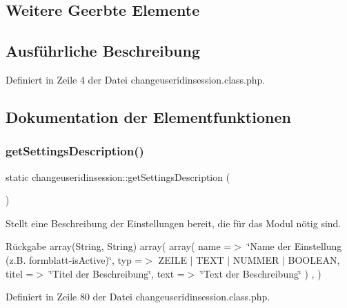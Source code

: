 \subsection*{Weitere Geerbte Elemente}


\subsection{Ausführliche Beschreibung}


Definiert in Zeile 4 der Datei changeuseridinsession.\+class.\+php.



\subsection{Dokumentation der Elementfunktionen}
\mbox{\label{classchangeuseridinsession_ab7adbdcd171a28a9ce89cd8e76aea03d}} 
\subsubsection{\texorpdfstring{get\+Settings\+Description()}{getSettingsDescription()}}
{\footnotesize\ttfamily static changeuseridinsession\+::get\+Settings\+Description (\begin{DoxyParamCaption}{ }\end{DoxyParamCaption})\hspace{0.3cm}{\ttfamily [static]}}

Stellt eine Beschreibung der Einstellungen bereit, die für das Modul nötig sind. \begin{DoxyReturn}{Rückgabe}
array(\+String, String) array( array( \textquotesingle{}name\textquotesingle{} =$>$ \char`\"{}\+Name der Einstellung (z.\+B. formblatt-\/is\+Active)\char`\"{}, \textquotesingle{}typ\textquotesingle{} =$>$ Z\+E\+I\+LE $\vert$ T\+E\+XT $\vert$ N\+U\+M\+M\+ER $\vert$ B\+O\+O\+L\+E\+AN, \textquotesingle{}titel\textquotesingle{} =$>$ \char`\"{}\+Titel der Beschreibung\char`\"{}, \textquotesingle{}text\textquotesingle{} =$>$ \char`\"{}\+Text der Beschreibung\char`\"{} ) , ) 
\end{DoxyReturn}


Definiert in Zeile 80 der Datei changeuseridinsession.\+class.\+php.

